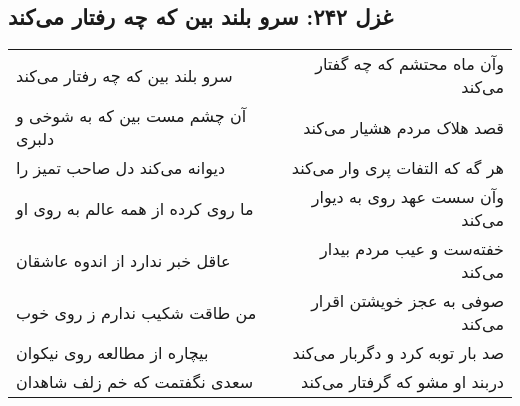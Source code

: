 \begin{center}
\section*{غزل ۲۴۲: سرو بلند بین که چه رفتار می‌کند}
\label{sec:242}
\begin{longtable}{l p{0.5cm} r}
سرو بلند بین که چه رفتار می‌کند
&&
وآن ماه محتشم که چه گفتار می‌کند
\\
آن چشم مست بین که به شوخی و دلبری
&&
قصد هلاک مردم هشیار می‌کند
\\
دیوانه می‌کند دل صاحب تمیز را
&&
هر گه که التفات پری وار می‌کند
\\
ما روی کرده از همه عالم به روی او
&&
وآن سست عهد روی به دیوار می‌کند
\\
عاقل خبر ندارد از اندوه عاشقان
&&
خفته‌ست و عیب مردم بیدار می‌کند
\\
من طاقت شکیب ندارم ز روی خوب
&&
صوفی به عجز خویشتن اقرار می‌کند
\\
بیچاره از مطالعه روی نیکوان
&&
صد بار توبه کرد و دگربار می‌کند
\\
سعدی نگفتمت که خم زلف شاهدان
&&
دربند او مشو که گرفتار می‌کند
\\
\end{longtable}
\end{center}
